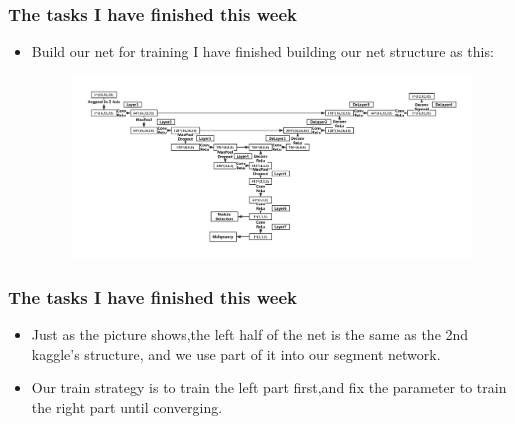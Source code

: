 \documentclass[8pt]{beamer}
\begin{document}
\begin{frame}[fragile]
\frametitle{The tasks I have finished this week}
\vspace{.3cm}
\begin{itemize}
\item Build our net for training 
	\vspace{.3cm}
	I have finished building our net structure as this:
	\begin{figure}[H]
		\centering
		\includegraphics[width=1.0\textwidth]{FirstProject.pdf} 
	\end{figure}
\end{itemize}
\end{frame}

\begin{frame}[fragile]
\frametitle{The tasks I have finished this week}
\vspace{.3cm}
\begin{itemize}
	\item Just as the picture shows,the left half of the net is the same as the 2nd kaggle's structure, and we use part of it into our segment network.
	\vspace{.3cm}
	\item Our train strategy is to train the left part first,and fix the parameter to train the right part until converging.

\end{itemize}
\end{frame}
\end{document}
